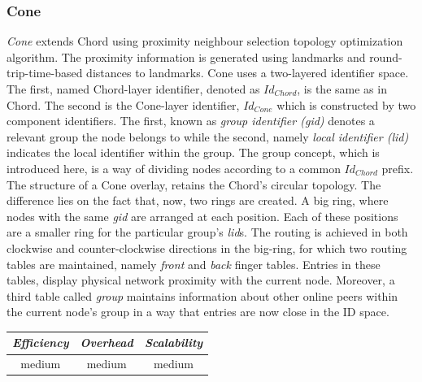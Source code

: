 \subsubsection{Cone}
\emph{Cone} \cite{wang_cone_2007} extends Chord using proximity neighbour
selection topology optimization algorithm. The proximity information is
generated using landmarks and round-trip-time-based distances to landmarks.
Cone uses a two-layered identifier space. The first, named Chord-layer
identifier, denoted as $Id_{Chord}$, is the same as in Chord. The second is the
Cone-layer identifier, $Id_{Cone}$ which is constructed by two component
identifiers. The first, known as \emph{group identifier (gid)} denotes a
relevant group the node belongs to while the second, namely \emph{local
identifier (lid)} indicates the local identifier within the group. The group
concept, which is introduced here, is a way of dividing nodes according to a
common $Id_{Chord}$ prefix.  The structure of a Cone overlay, retains the
Chord's circular topology. The difference lies on the fact that, now, two rings
are created. A big ring, where nodes with the same \emph{gid} are arranged at
each position. Each of these positions are a smaller ring for the particular
group's \emph{lid}s. The routing is achieved in both clockwise and
counter-clockwise directions in the big-ring, for which two routing tables are
maintained, namely \emph{front} and \emph{back} finger tables. Entries in these
tables, display physical network proximity with the current node. Moreover, a
third table called \emph{group} maintains information about other online peers
within the current node's group in a way that entries are now close in the ID
space.

%
%

\begin{center}
\begin{tabular}{ccc}
\emph{Efficiency} & \emph{Overhead} & \emph{Scalability} \\
\hline
medium &
medium &
medium
\end{tabular}
\end{center}

